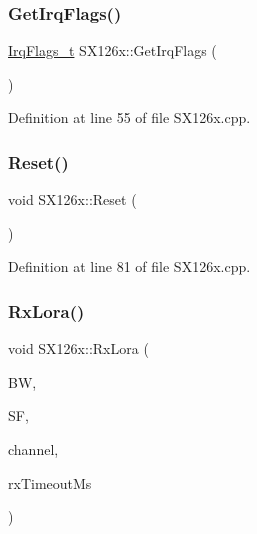 \subsubsection{\texorpdfstring{Get\+Irq\+Flags()}{GetIrqFlags()}}
{\footnotesize\ttfamily \mbox{\hyperlink{_define_8h_ab50e1f84d728c6ede52a9606a2a262d5}{Irq\+Flags\+\_\+t}} S\+X126x\+::\+Get\+Irq\+Flags (\begin{DoxyParamCaption}\item[{void}]{ }\end{DoxyParamCaption})}



Definition at line 55 of file S\+X126x.\+cpp.

\mbox{\label{class_s_x126x_a062d1439cea26e3e531e5df8ade82f0b}} 
\subsubsection{\texorpdfstring{Reset()}{Reset()}}
{\footnotesize\ttfamily void S\+X126x\+::\+Reset (\begin{DoxyParamCaption}\item[{void}]{ }\end{DoxyParamCaption})}



Definition at line 81 of file S\+X126x.\+cpp.

\mbox{\label{class_s_x126x_a027376634d0192e48ce57891cef8b6f3}} 
\subsubsection{\texorpdfstring{Rx\+Lora()}{RxLora()}}
{\footnotesize\ttfamily void S\+X126x\+::\+Rx\+Lora (\begin{DoxyParamCaption}\item[{\mbox{\hyperlink{_define_8h_a6cbb491180e131f374cdbe63880c85e1}{e\+Band\+Width}}}]{BW,  }\item[{uint8\+\_\+t}]{SF,  }\item[{uint32\+\_\+t}]{channel,  }\item[{uint32\+\_\+t}]{rx\+Timeout\+Ms }\end{DoxyParamCaption})}



